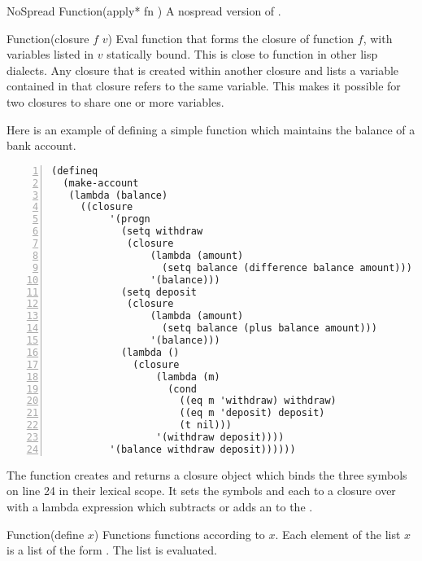 \begin{defun}{NoSpread Function}{(apply* fn \xargs)}
  A nospread version of .

\end{defun}

\begin{defun}{Function}{(closure $f$ $v$)}
  \label{closure}
  Eval function that forms the closure of function $f$, with variables
  listed in $v$ statically bound.  This is close to function in other
  lisp dialects. Any closure that is created within another closure
  and lists a variable contained in that closure refers to the same
  variable. This makes it possible for two closures to share one or
  more variables.

  Here is an example of defining a simple function which maintains the
  balance of a bank account.

  \begin{lstlisting}[numbers=left,numberstyle=\tiny]
(defineq
  (make-account
   (lambda (balance)
     ((closure
          '(progn
            (setq withdraw
             (closure
                 (lambda (amount)
                   (setq balance (difference balance amount)))
                 '(balance)))
            (setq deposit
             (closure
                 (lambda (amount)
                   (setq balance (plus balance amount)))
                 '(balance)))
            (lambda ()
              (closure
                  (lambda (m)
                    (cond
                      ((eq m 'withdraw) withdraw)
                      ((eq m 'deposit) deposit)
                      (t nil)))
                  '(withdraw deposit))))
          '(balance withdraw deposit))))))
  \end{lstlisting}

  The function  creates and returns a closure
  object which binds the three symbols on line 24 in their lexical
  scope. It sets the symbols  and  each
  to a closure over  with a lambda expression which
  subtracts or adds an  to the .
\end{defun}


\begin{defun}{Function}{(define $x$)}
  Functions functions according to $x$. Each element of the list $x$
  is a list of the form . The list is
  evaluated.
\end{defun}

